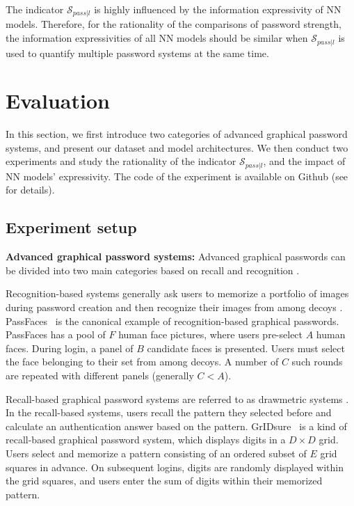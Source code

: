 \documentclass{article}
\begin{document}
The indicator $\mathcal{S}_{pass|l}$ is highly influenced by the information expressivity of NN models. Therefore, for the rationality of the comparisons of password strength, the information expressivities of all NN models should be similar when $\mathcal{S}_{pass|l}$ is used to quantify multiple password systems at the same time.


\section{Evaluation}\label{sec:evaluation}
In this section, we first introduce two categories of advanced graphical password systems, and present our dataset and model architectures. We then conduct two experiments and study the rationality of the indicator $\mathcal{S}_{pass|l}$, and the impact of NN models' expressivity. The code of the experiment is available on Github (see \cite{gys} for details).

\subsection{Experiment setup}

\textbf{Advanced graphical password systems:} Advanced graphical passwords can be divided into two main categories based on recall and recognition \cite{Raaijmakers1992Models}.

Recognition-based systems generally ask users to memorize a portfolio of images during password creation and then recognize their images from among decoys \cite{DBLP:journals/csur/BiddleCO12,DBLP:journals/ijics/Renaud09}. PassFaces~\cite{Passfaces} is the canonical example of recognition-based graphical passwords. PassFaces has a pool of $F$ human face pictures, where users pre-select $A$ human faces. During login, a panel of $B$ candidate faces is presented. Users must select the face belonging to their set from among decoys. A number of $C$ such rounds are repeated with different panels (generally $C < A$).

Recall-based graphical password systems are referred to as drawmetric systems \cite{DBLP:journals/ijmms/AngeliCJR05}. In the recall-based systems, users recall the pattern they selected before and calculate an authentication answer based on the pattern. GrIDsure~\cite{Brostoff2010Evaluating} is a kind of recall-based graphical password system, which displays digits in a $D \times D$ grid. Users select and memorize a pattern consisting of an ordered subset of $E$ grid squares in advance. On subsequent logins, digits are randomly displayed within the grid squares, and users enter the sum of digits within their memorized pattern.
\end{document}
